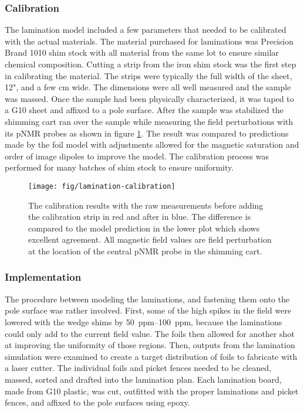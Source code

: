 \subsubsection{Calibration}

The lamination model included a few parameters that needed to be calibrated with the actual materials.  The material purchased for laminations was Precision Brand 1010 shim stock with all material from the same lot to ensure similar chemical composition.  Cutting a strip from the iron shim stock was the first step in calibrating the material.  The strips were typically the full width of the sheet, 12", and a few \si{\centi\meter} wide.  The dimensions were all well measured and the sample was massed.  Once the sample had been physically characterized, it was taped to a G10 sheet and affixed to a pole surface.  After the sample was stabilized the shimming cart ran over the sample while measuring the field perturbations with its pNMR probes as shown in figure \ref{fig:lamination-calibration}.  The result was compared to predictions made by the foil model with adjustments allowed for the magnetic saturation and order of image dipoles to improve the model.  The calibration process was performed for many batches of shim stock to ensure uniformity.

\begin{figure}
\centering
\texttt{[image: fig/lamination-calibration]}
\caption{
    The calibration results with the raw measurements before adding the calibration strip in red and after in blue.  The difference is compared to the model prediction in the lower plot which shows excellent agreement.  All magnetic field values are field perturbation at the location of the central pNMR probe in the shimming cart. 
    \label{fig:lamination-calibration}
}
\end{figure}

\subsubsection{Implementation}

The procedure between modeling the laminations, and fastening them onto the pole surface was rather involved.  First, some of the high spikes in the field were lowered with the wedge shims by \SIrange{50}{100}{ppm}, because the laminations could only add to the current field value.  The foils then allowed for another shot at improving the uniformity of those regions.  Then, outputs from the lamination simulation were examined to create a target distribution of foils to fabricate with a laser cutter.  The individual foils and picket fences needed to be cleaned, massed, sorted and drafted into the lamination plan.  Each lamination board, made from G10 plastic, was cut, outfitted with the proper laminations and picket fences, and affixed to the pole surfaces using epoxy.

